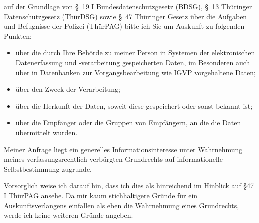 auf der Grundlage von §~19 I Bundesdatenschutzgesetz (BDSG),
§~13 Thüringer Datenschutzgesetz (ThürDSG) sowie
§~47 Thüringer Gesetz über die Aufgaben und Befugnisse der Polizei (ThürPAG) bitte
ich Sie um Auskunft zu folgenden Punkten:

\begin{itemize}
  \item über die durch Ihre Behörde zu meiner Person in Systemen der elektronischen
  Datenerfassung und -verarbeitung gespeicherten Daten, im Besonderen auch über
  in Datenbanken zur Vorgangsbearbeitung wie IGVP vorgehaltene Daten;

  \item über den Zweck der Verarbeitung;

  \item über die Herkunft der Daten, soweit diese gespeichert oder sonst bekannt ist;

  \item über die Empfänger oder die Gruppen von Empfängern, an die die Daten übermittelt wurden.
\end{itemize}

Meiner Anfrage liegt ein generelles Informationsinteresse unter Wahrnehmung
meines verfassungsrechtlich verbürgten Grundrechts auf informationelle
Selbstbestimmung zugrunde.

Vorsorglich weise ich darauf hin, dass ich dies als hinreichend im
Hinblick auf §47 I ThürPAG ansehe. Da mir kaum stichhaltigere Gründe
für ein Auskunftsverlangens einfallen als eben die Wahrnehmung eines
Grundrechts, werde ich keine weiteren Gründe angeben.
